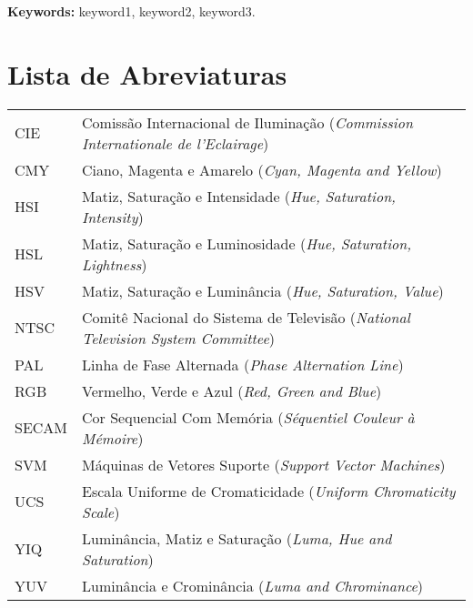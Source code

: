 \documentclass[11pt,twoside,a4paper]{book}
\theoremstyle{plain}
\theoremstyle{definition}
\begin{document}
\noindent \textbf{Keywords:} keyword1, keyword2, keyword3.

\tableofcontents    %

\chapter{Lista de Abreviaturas}
\begin{tabular}{ll}
    CIE         & Comissão Internacional de Iluminação (\emph{Commission Internationale de l'Eclairage})\\
    CMY         & Ciano, Magenta e Amarelo (\emph{Cyan, Magenta and Yellow})\\
    HSI         & Matiz, Saturação e Intensidade (\emph{Hue, Saturation, Intensity})\\
    HSL         & Matiz, Saturação e Luminosidade (\emph{Hue, Saturation, Lightness})\\
    HSV         & Matiz, Saturação e Luminância (\emph{Hue, Saturation, Value})\\
    NTSC        & Comitê Nacional do Sistema de Televisão (\emph{National Television System Committee})\\
    PAL         & Linha de Fase Alternada (\emph{Phase Alternation Line})\\
    RGB         & Vermelho, Verde e Azul (\emph{Red, Green and Blue})\\
    SECAM       & Cor Sequencial Com Memória (\emph{Séquentiel Couleur à Mémoire})\\
    SVM         & Máquinas de Vetores Suporte (\emph{Support Vector Machines})\\
    UCS         & Escala Uniforme de Cromaticidade (\emph{Uniform Chromaticity Scale})\\
    YIQ         & Luminância, Matiz e Saturação (\emph{Luma, Hue and Saturation})\\
    YUV         & Luminância e Crominância (\emph{Luma and Chrominance})\\
\end{tabular}

\end{document}
